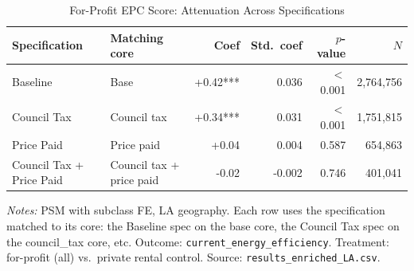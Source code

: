 \begin{table}[htbp]
\centering
\caption{For-Profit EPC Score: Attenuation Across Specifications}
\label{tab:h1_attenuation_fp}
\begin{tabular}{llrrrr}
\toprule
Specification & Matching core & Coef & Std.\ coef & $p$-value & $N$ \\
\midrule
Baseline & Base & +0.42*** & 0.036 & $<$0.001 & 2,764,756 \\
Council Tax & Council tax & +0.34*** & 0.031 & $<$0.001 & 1,751,815 \\
Price Paid & Price paid & +0.04 & 0.004 & 0.587 & 654,863 \\
Council Tax + Price Paid & Council tax + price paid & -0.02 & -0.002 & 0.746 & 401,041 \\
\bottomrule
\end{tabular}
\begin{minipage}{0.9\textwidth}
\vspace{4pt}
\footnotesize
\textit{Notes:} PSM with subclass FE, LA geography.
Each row uses the specification matched to its core: the Baseline spec on the base core,
the Council Tax spec on the council\_tax core, etc.
Outcome: \texttt{current\_energy\_efficiency}.
Treatment: for-profit (all) vs.\ private rental control.
Source: \texttt{results\_enriched\_LA.csv}.
\end{minipage}
\end{table}
